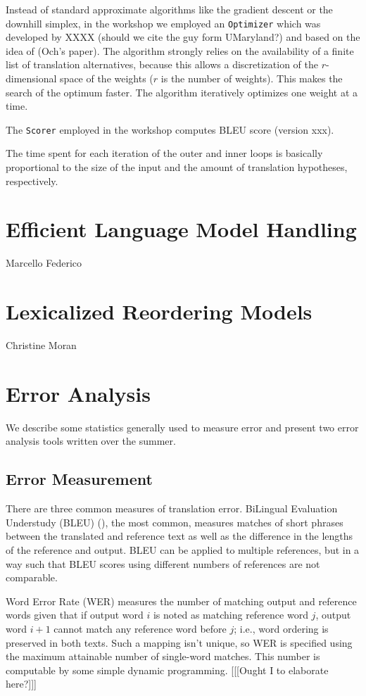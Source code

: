 \documentclass[11pt]{book}
\theoremstyle{plain}
\begin{document}
Instead of standard approximate algorithms like the gradient descent or the downhill simplex, in the workshop we employed an {\tt Optimizer} which was developed by XXXX (should we cite the guy form UMaryland?) and based on the idea of \cite{xx} (Och's paper). The algorithm strongly relies on the availability of a finite list of translation alternatives, because this allows a discretization of the $r$-dimensional space of the weights ($r$ is the number of weights). This makes the search of the optimum  faster. The algorithm iteratively optimizes one weight at a time.

The {\tt Scorer} employed in the workshop computes BLEU score (version xxx).

The time spent for each iteration of the outer and inner loops is basically proportional to the size of the input and the amount of translation hypotheses, respectively.

\section{Efficient Language Model Handling}
{\sc Marcello Federico}

\section{Lexicalized Reordering Models}
{\sc Christine Moran}

\section{Error Analysis}
We describe some statistics generally used to measure error and present two error analysis tools written over the summer.

\subsection{Error Measurement}
There are three common measures of translation error. BiLingual Evaluation Understudy (BLEU) (\cite{bleu}), the most common, measures matches of short phrases between the translated and reference text as well as the difference in the lengths of the reference and output. BLEU can be applied to multiple references, but in a way such that BLEU scores using different numbers of references are not comparable.

Word Error Rate (WER) measures the number of matching output and reference words given that if output word $i$ is noted as matching reference word $j$, output word $i + 1$ cannot match any reference word before $j$; i.e., word ordering is preserved in both texts. Such a mapping isn't unique, so WER is specified using the maximum attainable number of single-word matches. This number is computable by some simple dynamic programming. [[[Ought I to elaborate here?]]]
\end{document}
